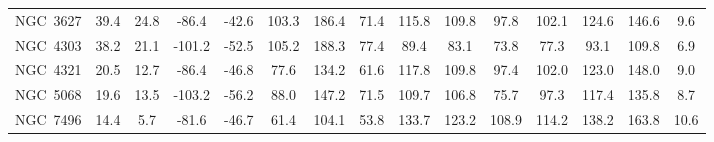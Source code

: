 \begin{table}
\begin{tabular}{ccccccccccccccc}
NGC~3627 & 39.4 & 24.8 & -86.4 & -42.6 & 103.3 & 186.4 & 71.4 & 115.8 & 109.8 & 97.8 & 102.1 & 124.6 & 146.6 & 9.6 \\
NGC~4303 & 38.2 & 21.1 & -101.2 & -52.5 & 105.2 & 188.3 & 77.4 & 89.4 & 83.1 & 73.8 & 77.3 & 93.1 & 109.8 & 6.9 \\
NGC~4321 & 20.5 & 12.7 & -86.4 & -46.8 & 77.6 & 134.2 & 61.6 & 117.8 & 109.8 & 97.4 & 102.0 & 123.0 & 148.0 & 9.0 \\
NGC~5068 & 19.6 & 13.5 & -103.2 & -56.2 & 88.0 & 147.2 & 71.5 & 109.7 & 106.8 & 75.7 & 97.3 & 117.4 & 135.8 & 8.7 \\
NGC~7496 & 14.4 & 5.7 & -81.6 & -46.7 & 61.4 & 104.1 & 53.8 & 133.7 & 123.2 & 108.9 & 114.2 & 138.2 & 163.8 & 10.6 \\
\end{tabular}
\end{table}
